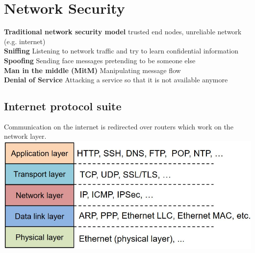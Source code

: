 \documentclass[12pt]{article}
\begin{document}
	\section{Network Security}
	\textbf{Traditional network security model} trusted end nodes, unreliable network (e.g. internet)\\
	\textbf{Sniffing} Listening to network traffic and try to learn confidential information\\
	\textbf{Spoofing} Sending face messages pretending to be someone else\\
	\textbf{Man in the middle (MitM)} Manipulating message flow\\
	\textbf{Denial of Service} Attacking a service so that it is not available anymore
	
	\subsection{Internet protocol suite}
	Communication on the internet is redirected over routers which work on the network layer.\\
	\includegraphics[width=\textwidth]{figures/internet-protocol-suite.JPG}\\
\end{document}
